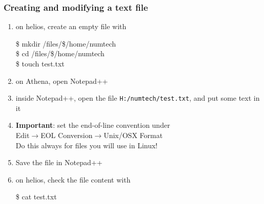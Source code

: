 \documentclass[aspectratio=43,9pt]{beamer}
\begin{document}
\begin{frame}
	\frametitle{Creating and modifying a text file}
	\begin{enumerate}
		\item on helios, create an empty file with
			\par\vspace*{1ex}\hspace*{.05\textwidth}\parbox{.5\textwidth}{\ttfamily
				\$   mkdir  /files/\$/home/numtech\\
				\$   cd  /files/\$/home/numtech\\
				\$   touch  test.txt
			}\vspace*{1ex}\par\vspace*{2ex}
		\item on Athena, open Notepad++\vspace*{2ex}
		\item inside {Notepad++}, open the file \texttt{H:/numtech/test.txt}, and put some text in it\vspace*{2ex}
		\item \textbf{Important}: set the end-of-line convention under\\ Edit$\rightarrow$EOL Conversion$\rightarrow$Unix/OSX Format\\ Do this always for files you will use in Linux!\vspace*{2ex}
		\item Save the file in Notepad++\vspace*{2ex}
		\item on helios, check the file content with
			\par\vspace*{1ex}\hspace*{.05\textwidth}\parbox{.5\textwidth}{\ttfamily
				\$   cat  test.txt
			}\vspace*{1ex}\par
	\end{enumerate}
\end{frame}
%
%
\end{document}
